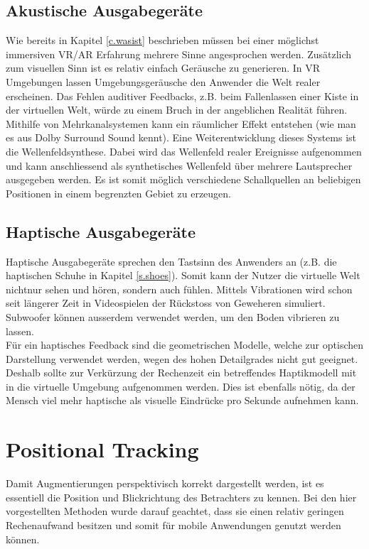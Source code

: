 \subsection*{Akustische Ausgabegeräte}
Wie bereits in Kapitel \ref{c.wasist} beschrieben müssen bei einer möglichst immersiven VR/AR Erfahrung mehrere Sinne angesprochen werden. Zusätzlich zum visuellen Sinn ist es relativ einfach Geräusche zu generieren. In VR Umgebungen lassen Umgebungsgeräusche den Anwender die Welt realer erscheinen. Das Fehlen auditiver Feedbacks, z.B. beim Fallenlassen einer Kiste in der virtuellen Welt, würde zu einem Bruch in der angeblichen Realität führen.\\[6pt]
Mithilfe von Mehrkanalsystemen kann ein räumlicher Effekt entstehen (wie man es aus Dolby Surround Sound kennt). Eine Weiterentwicklung dieses Systems ist die Wellenfeldsynthese. Dabei wird das Wellenfeld realer Ereignisse aufgenommen und kann anschliessend als synthetisches Wellenfeld über mehrere Lautsprecher ausgegeben werden. Es ist somit möglich verschiedene Schallquellen an beliebigen Positionen in einem begrenzten Gebiet zu erzeugen.\cite[S.~154]{doerner13}
\vspace{-10pt}
\subsection*{Haptische Ausgabegeräte}
Haptische Ausgabegeräte sprechen den Tastsinn des Anwenders an (z.B. die haptischen Schuhe in Kapitel \ref{s.shoes}). Somit kann der Nutzer die virtuelle Welt nichtnur sehen und hören, sondern auch fühlen. Mittels Vibrationen wird schon seit längerer Zeit in Videospielen der Rückstoss von Geweheren simuliert. Subwoofer können ausserdem verwendet werden, um den Boden vibrieren zu lassen.\\[6pt]
Für ein haptisches Feedback sind die geometrischen Modelle, welche zur optischen Darstellung verwendet werden, wegen des hohen Detailgrades nicht gut geeignet. Deshalb sollte zur Verkürzung der Rechenzeit ein betreffendes Haptikmodell mit in die virtuelle Umgebung aufgenommen werden. Dies ist ebenfalls nötig, da der Mensch viel mehr haptische als visuelle Eindrücke pro Sekunde aufnehmen kann.\cite[S.~154~f.]{doerner13}
\newpage
\section{Positional Tracking}\label{s.positional}
Damit Augmentierungen perspektivisch korrekt dargestellt werden, ist es essentiell die Position und Blickrichtung des Betrachters zu kennen. Bei den hier vorgestellten Methoden wurde darauf geachtet, dass sie einen relativ geringen Rechenaufwand besitzen und somit für mobile Anwendungen genutzt werden können.
\vspace{-10pt}
